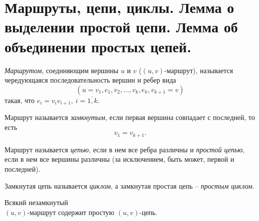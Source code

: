 \section{Маршруты, цепи, циклы. Лемма о выделении простой цепи. Лемма об объединении простых цепей.}

\begin{definition}[Маршрут]
    \emph{Маршрутом}, соединяющим вершины $ u $ и $ v $ ($ (u,v) $-маршрут), называется чередующаяся последовательность вершин и ребер вида
    \[
        (u = v_1,e_1,v_2,\ldots,v_k,e_k,v_{k+1}=v)
    \]
    такая, что $ e_i = v_iv_{i+1}, \ i = \overline{1,k} $.
\end{definition}

\begin{definition}
    Маршрут называется \emph{замкнутым}, если первая вершина совпадает с последней, то есть
    \[
        v_1=v_{k+1}.
    \]
\end{definition}

\newpage

\begin{definition}
    Маршрут называется \emph{цепью}, если в нем все ребра различны и \emph{простой цепью}, если в нем все вершины различны (за исключением, быть может, первой и последней).
    \begin{figure}[H]
        \centering
        \label{fig:fig_05}
    \end{figure}
\end{definition}

\begin{definition}
    Замкнутая цепь называется \emph{циклом}, а замкнутая простая цепь -- \emph{простым циклом}.
    \begin{figure}[H]
        \centering
        \label{fig:fig_06}
    \end{figure}
\end{definition}

\begin{lemma}
    Всякий незамкнутый \\ $ (u,v) $-маршрут содержит простую $ (u,v) $-цепь.
\end{lemma}

